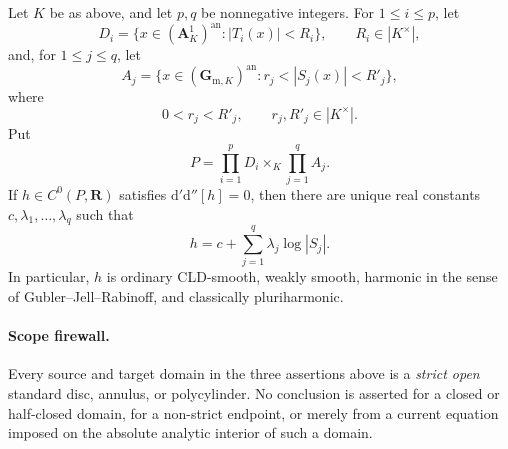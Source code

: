 \begin{theorem}\label{thm:p062-arbitrary-field-polycylinder-candidate}
Let \(K\) be as above, and let \(p,q\) be nonnegative integers. For
\(1\leq i\leq p\), let
\[
 D_i=\{x\in(\mathbf A^1_K)^{\mathrm{an}}:|T_i(x)|<R_i\},
 \qquad R_i\in|K^\times|,
\]
and, for \(1\leq j\leq q\), let
\[
 A_j=\{x\in(\mathbf G_{\mathrm m,K})^{\mathrm{an}}:
                  r_j<|S_j(x)|<R'_j\},
\]
where
\[
                  0<r_j<R'_j,
 \qquad r_j,R'_j\in|K^\times|.
\]
Put
\[
                         P=\prod_{i=1}^pD_i\times_K
                           \prod_{j=1}^qA_j.
\]
If \(h\in C^0(P,\mathbf R)\) satisfies
\(
 \mathrm d'\mathrm d''[h]=0
\), then there are unique real constants
\(c,\lambda_1,\ldots,\lambda_q\) such that
\begin{equation}\label{eq:p062-polycylinder-affine-candidate}
                   h=c+\sum_{j=1}^q\lambda_j\log|S_j|.
\end{equation}
In particular, \(h\) is ordinary CLD-smooth, weakly smooth, harmonic in
the sense of Gubler--Jell--Rabinoff, and classically pluriharmonic.
\end{theorem}

\paragraph{Scope firewall.}
Every source and target domain in the three assertions above is a
\emph{strict open} standard disc, annulus, or polycylinder.  No conclusion
is asserted for a closed or half-closed domain, for a non-strict endpoint,
or merely from a current equation imposed on the absolute analytic
interior of such a domain.
